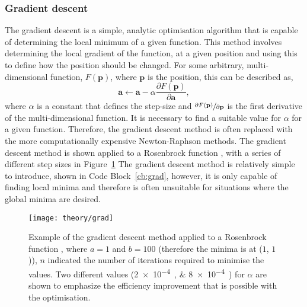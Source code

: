 \subsubsection{Gradient descent}
The gradient descent is a simple, analytic optimisation algorithm that is capable of determining the local minimum of a given function.
This method involves determining the local gradient of the function, at a given position and using this to define how the position should be changed.
For some arbitrary, multi-dimensional function, $F(\mathbf{p})$, where $\mathbf{p}$ is the position, this can be described as,
%
\begin{equation}
\mathbf{a} \leftarrow \mathbf{a} - \alpha \frac{\partial F(\mathbf{p})}{\partial \mathbf{a}},
\end{equation}
%
where $\alpha$ is a constant that defines the step-size and $\sfrac{\partial F(\mathbf{p})}{\partial \mathbf{p}}$ is the first derivative of the multi-dimensional function.
It is necessary to find a suitable value for $\alpha$ for a given function.
Therefore, the gradient descent method is often replaced with the more computationally expensive Newton-Raphson methods.
The gradient descent method is shown applied to a Rosenbrock function \cite{rosenbrock_automatic_1960}, with a series of different step sizes in Figure~\ref{fig:grad}
The gradient descent method is relatively simple to introduce, shown in Code Block~\ref{cb:grad}, however, it is only capable of finding local minima and therefore is often unsuitable for situations where the global minima are desired.
%
\begin{figure}
    \centering
    \texttt{[image: theory/grad]}
    \caption{Example of the gradient descent method applied to a Rosenbrock function \cite{rosenbrock_automatic_1960}, where $a=1$ and $b=100$ (therefore the minima is at ($1$, $1$)), $n$ indicated the number of iterations required to minimise the values. Two different values (\SIlist{2e-4;8e-4}{}) for $\alpha$ are shown to emphasize the efficiency improvement that is possible with the optimisation.}
    \label{fig:grad}
\end{figure}
%
%
\begin{figure}
    \centering
        
\end{figure}
%

